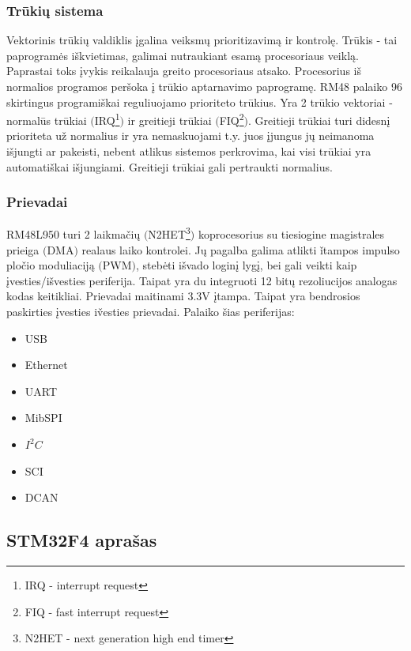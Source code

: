 \documentclass[a4paper, 12pt]{article} %
\begin{document}
\begin{onehalfspacing}
\subsubsection{Tr\=uki\k{u} sistema}
Vektorinis tr\=uki\k{u} valdiklis \k{i}galina veiksm\k{u} prioritizavim\k{a} ir kontrol\k{e}. Tr\=ukis - tai paprogram\.es i\v{s}kvietimas, galimai nutraukiant esam\k{a} procesoriaus veikl\k{a}. Paprastai toks \k{i}vykis reikalauja greito procesoriaus atsako. Procesorius i\v{s} normalios programos per\v{s}oka \k{i} tr\=ukio aptarnavimo paprogram\k{e}. RM48 palaiko 96 skirtingus programi\v{s}kai reguliuojamo prioriteto tr\=ukius. Yra 2 tr\=ukio vektoriai - normal\=us tr\=ukiai $($IRQ\footnote{IRQ - interrupt request}$)$ ir greitieji tr\=ukiai $($FIQ\footnote{FIQ - fast interrupt request}$)$. Greitieji tr\=ukiai turi didesn\k{i} prioriteta u\v{z} normalius ir yra nemaskuojami t.y. juos \k{i}jungus j\k{u} neimanoma i\v{s}jungti ar pakeisti, nebent atlikus sistemos perkrovima, kai visi tr\=ukiai yra automati\v{s}kai i\v{s}jungiami. Greitieji tr\=ukiai gali pertraukti normalius.  


\subsubsection{Prievadai}
RM48L950 turi 2 laikma\v{c}i\k{u} $($N2HET\footnote{N2HET - next generation high end timer}$)$ koprocesorius su tiesiogine magistrales prieiga $($DMA$)$ realaus laiko kontrolei. J\k{u} pagalba galima atlikti \v{i}tampos impulso plo\v{c}io moduliacij\k{a} $($PWM$)$, steb\.eti i\v{s}vado login\k{i} lyg\k{i}, bei gali veikti kaip \k{i}vesties/i\v{s}vesties periferija. Taipat yra du integruoti 12 bit\k{u} rezoliucijos analogas kodas keitikliai. Prievadai maitinami 3.3V \k{i}tampa. Taipat yra bendrosios paskirties \k{i}vesties i\v{v}esties prievadai.
Palaiko \v{s}ias periferijas:
\begin{itemize}
\item USB
\item Ethernet
\item UART
\item MibSPI
\item $I^2C$
\item SCI
\item DCAN
\end{itemize}



\subsection{STM32F4 apra\v{s}as}



\end{onehalfspacing}
\end{document}
